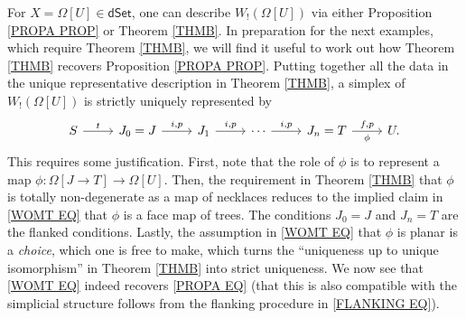\documentclass{hha}
\theoremstyle{definition} %
\begin{document}
\begin{example}\label{WREP_EX}
	For $X=\Omega[U]\in \mathsf{dSet}$,
	one can describe $W_!(\Omega[U])$
	via either Proposition \ref{PROPA PROP} or Theorem \ref{THMB}.
	In preparation for the next examples, 
	which require Theorem \ref{THMB},
	we will find it useful to work out how 
	Theorem \ref{THMB} recovers Proposition \ref{PROPA PROP}. 
	Putting together all the data in the unique representative description
	in Theorem \ref{THMB},
	a simplex of $W_!(\Omega[U])$ is strictly uniquely represented by
\begin{equation}\label{WOMT EQ}
\begin{tikzcd}
	S \ar{r}{t} &
	J_0 = J \ar{r}{i,p} &
	J_1 \ar{r}{i,p} &
	\cdots \ar{r}{i,p} &
	J_n = T \ar{r}{f,p}[swap]{\phi} &
	U.
\end{tikzcd}
\end{equation}
This requires some justification. 
First, note that the role of $\phi$ is to represent a map
$\phi \colon \Omega[J\to T] \to \Omega[U]$. 
Then, the requirement in Theorem \ref{THMB} that $\phi$ is totally non-degenerate 
as a map of necklaces reduces to the implied claim in 
\eqref{WOMT EQ} that $\phi$ is a face map of trees.
The conditions $J_0 =J$ and $J_n = T$ are the flanked conditions.
Lastly, the assumption in \eqref{WOMT EQ}
that $\phi$ is planar is a \emph{choice}, 
which one is free to make, which turns the 
``uniqueness up to unique isomorphism''
in Theorem \ref{THMB} into strict uniqueness.
We now see that \eqref{WOMT EQ} indeed recovers \eqref{PROPA EQ}
(that this is also compatible with the simplicial structure follows from the flanking procedure in \eqref{FLANKING EQ}).


\end{example}
\end{document}
